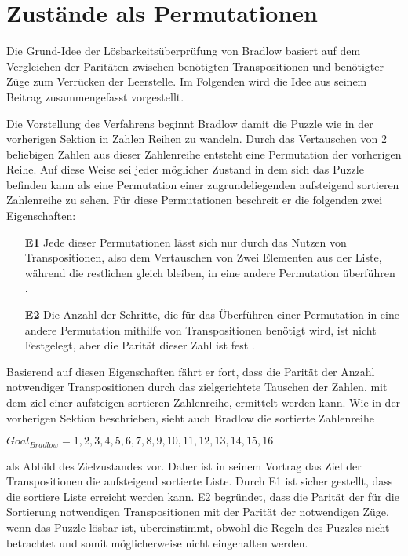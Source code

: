 
\section{Zustände als Permutationen} %
\label{sec:Permutation}
Die Grund-Idee der Lösbarkeitsüberprüfung von Bradlow basiert auf dem Vergleichen der Paritäten zwischen benötigten Transpositionen und benötigter Züge zum Verrücken der Leerstelle. Im Folgenden wird die Idee aus seinem Beitrag \autocite{Unsolvable-14-15-Numberphile-YT:online} zusammengefasst vorgestellt.\WNL

Die Vorstellung des Verfahrens beginnt Bradlow damit die Puzzle wie in der vorherigen Sektion in Zahlen Reihen zu wandeln. Durch das Vertauschen von 2 beliebigen Zahlen aus dieser Zahlenreihe entsteht eine Permutation der vorherigen Reihe. Auf diese Weise sei jeder möglicher Zustand in dem sich das Puzzle befinden kann als eine Permutation einer zugrundeliegenden aufsteigend sortieren Zahlenreihe zu sehen. Für diese Permutationen beschreit er die folgenden zwei Eigenschaften:
\begin{enumerate}
	\item[\textbf{E1}] Jede dieser Permutationen lässt sich nur durch das Nutzen von Transpositionen, also dem Vertauschen von Zwei Elementen aus der Liste, während die restlichen gleich bleiben, in eine andere Permutation überführen \cite[Vgl.][7min,07sec]{Unsolvable-14-15-Numberphile-YT:online}.
	\item[\textbf{E2}] Die Anzahl der Schritte, die für das Überführen einer Permutation in eine andere Permutation mithilfe von Transpositionen benötigt wird, ist nicht Festgelegt, aber die Parität dieser Zahl ist fest \cite[Vgl.][10min,13sec]{Unsolvable-14-15-Numberphile-YT:online}.
\end{enumerate}
Basierend auf diesen Eigenschaften fährt er fort, dass die Parität der Anzahl notwendiger Transpositionen durch das zielgerichtete Tauschen der Zahlen, mit dem ziel einer aufsteigen sortieren Zahlenreihe, ermittelt werden kann. Wie in der vorherigen Sektion beschrieben, sieht auch Bradlow die sortierte Zahlenreihe
\begin{center}
	$Goal_{Bradlow} = {1,2,3,4,5,6,7,8,9,10,11,12,13,14,15,16}$
\end{center}
als Abbild des Zielzustandes vor. Daher ist in seinem Vortrag das Ziel der Transpositionen die aufsteigend sortierte Liste. Durch E1 ist sicher gestellt, dass die sortiere Liste erreicht werden kann. E2 begründet, dass die Parität der für die Sortierung notwendigen Transpositionen mit der Parität der notwendigen Züge, wenn das Puzzle lösbar ist, übereinstimmt, obwohl die Regeln des Puzzles nicht betrachtet und somit möglicherweise nicht eingehalten werden.\WNL
